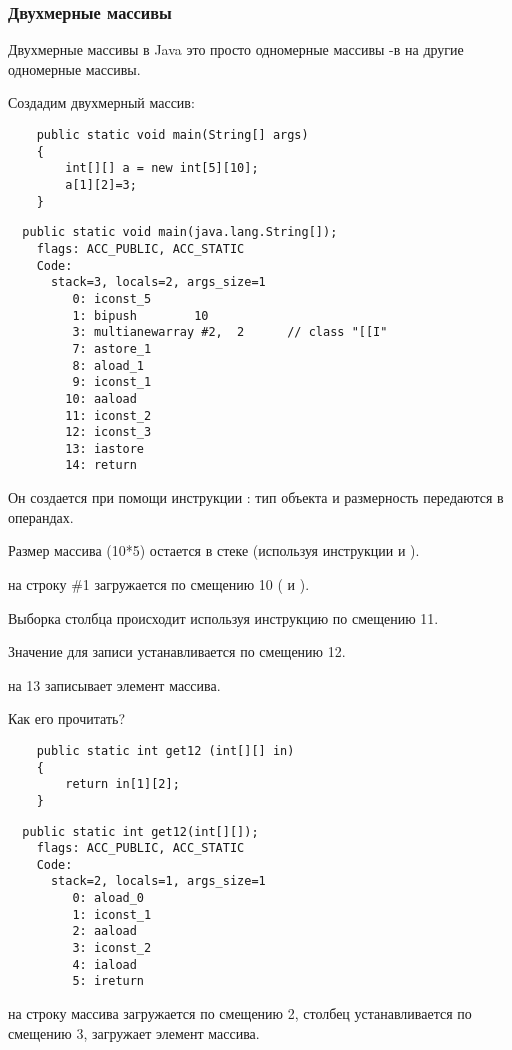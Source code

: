 \subsubsection{Двухмерные массивы}


Двухмерные массивы в Java это просто одномерные массивы -в на другие одномерные 
массивы.

Создадим двухмерный массив:

\begin{lstlisting}
	public static void main(String[] args)
	{
		int[][] a = new int[5][10];
		a[1][2]=3;
	}
\end{lstlisting}

\begin{lstlisting}
  public static void main(java.lang.String[]);
    flags: ACC_PUBLIC, ACC_STATIC
    Code:
      stack=3, locals=2, args_size=1
         0: iconst_5      
         1: bipush        10
         3: multianewarray #2,  2      // class "[[I"
         7: astore_1      
         8: aload_1       
         9: iconst_1      
        10: aaload        
        11: iconst_2      
        12: iconst_3      
        13: iastore       
        14: return        
\end{lstlisting}


Он создается при помощи инструкции : тип объекта и размерность передаются
в операндах.

Размер массива (10*5) остается в стеке (используя инструкции  и ).


 на строку \#1 загружается по смещению 10 ( и ).

Выборка столбца происходит используя инструкцию  по смещению 11.

Значение для записи устанавливается по смещению 12.

 на 13 записывает элемент массива.

Как его прочитать?

\begin{lstlisting}
	public static int get12 (int[][] in)
	{
		return in[1][2];
	}
\end{lstlisting}

\begin{lstlisting}
  public static int get12(int[][]);
    flags: ACC_PUBLIC, ACC_STATIC
    Code:
      stack=2, locals=1, args_size=1
         0: aload_0       
         1: iconst_1      
         2: aaload        
         3: iconst_2      
         4: iaload        
         5: ireturn       
\end{lstlisting}


 на строку массива загружается по смещению 2, 
столбец устанавливается по смещению 3,  загружает элемент массива.
